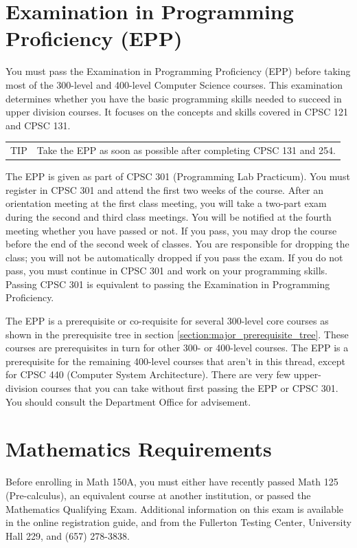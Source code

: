\documentclass{book}
\newenvironment{tip}
               {\tcolorbox \begin{tabular}{m{.5in} m{5in}} \Large{TIP} & }
               {\end{tabular} \endtcolorbox}
\begin{document}
\section{Examination in Programming Proficiency (EPP)}
You must pass the Examination in Programming Proficiency (EPP) before taking most of the 300-level and 400-level Computer Science courses. This examination determines whether you have the basic programming skills needed to succeed in upper division courses. It focuses on the concepts and skills covered in CPSC 121 and CPSC 131.

\begin{tip}
  Take the EPP as soon as possible after completing CPSC 131 and 254.
  \end{tip}

The EPP is given as part of CPSC 301 (Programming Lab Practicum). You must register in CPSC 301 and attend the first two weeks of the course. After an orientation meeting at the first class meeting, you will take a two-part exam during the second and third class meetings. You will be notified at the fourth meeting whether you have passed or not. If you pass, you may drop the course before the end of the second week of classes. You are responsible for dropping the class; you will not be automatically dropped if you pass the exam. If you do not pass, you must continue in CPSC 301 and work on your programming skills. Passing CPSC 301 is equivalent to passing the Examination in Programming Proficiency.

The EPP is a prerequisite or co-requisite for several 300-level core courses as shown in the prerequisite tree in section \ref{section:major_prerequisite_tree}. These courses are prerequisites in turn for other 300- or 400-level courses. The EPP is a prerequisite for the remaining 400-level courses that aren’t in this thread, except for CPSC 440 (Computer System Architecture). There are very few upper-division courses that you can take without first passing the EPP or CPSC 301. You should consult the Department Office for advisement.

\section{Mathematics Requirements}

Before enrolling in Math 150A, you must either have recently passed Math 125 (Pre-calculus), an equivalent course at another institution, or passed the Mathematics Qualifying Exam. Additional information on this exam is available in the online registration guide, and from the Fullerton Testing Center, University Hall 229, and (657) 278-3838.
\end{document}
